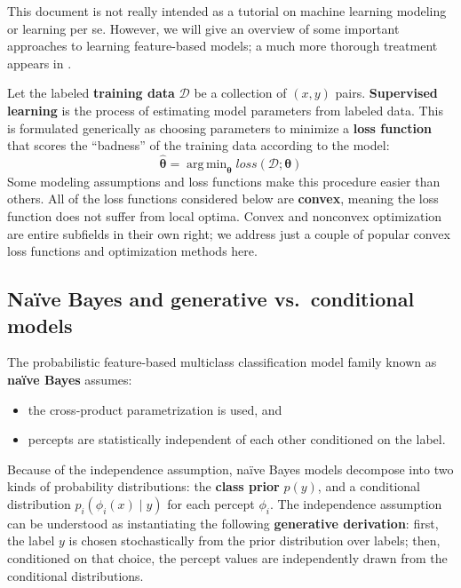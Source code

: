 \documentclass[11pt,letterpaper]{article}
\DeclareMathOperator*{\argmin}{arg\,min}
\begin{document}
This document is not really intended as a tutorial on machine learning modeling or learning per se. 
However, we will give an overview of some important approaches to learning feature-based models; 
a much more thorough treatment appears in \citet{smith}. 

Let the labeled \textbf{training data} $\mathcal{D}$ be a collection of $(x,y)$ pairs.
\textbf{Supervised learning} is the process of estimating model parameters from labeled data.
This is formulated generically as choosing parameters to minimize a \textbf{loss function} that scores the 
``badness'' of the training data according to the model:
\begin{equation}
\hat{\boldsymbol{\theta}} = \argmin_{\boldsymbol{\theta}} \textit{loss}(\mathcal{D}; \boldsymbol{\theta})
\end{equation}
Some modeling assumptions and loss functions make this procedure easier than others.
All of the loss functions considered below are \textbf{convex}, 
meaning the loss function does not suffer from local optima.
Convex and nonconvex optimization are entire subfields in their own right; 
we address just a couple of popular convex loss functions and optimization methods here.

\subsection{Na\"{i}ve Bayes and generative vs.~conditional models}\label{sec:naive}

The probabilistic feature-based multiclass classification model family known as \textbf{na\"{i}ve Bayes} assumes:
\begin{itemize}
  \item the cross-product parametrization is used, and
  \item percepts are statistically independent of each other conditioned on the label.
\end{itemize}

Because of the independence assumption, na\"{i}ve Bayes models decompose into two kinds of probability distributions:
the \textbf{class prior} $p(y)$, and a conditional distribution $p_i(\phi_i(x) \mid y)$ for each percept $\phi_i$.
The independence assumption can be understood as instantiating the following \textbf{generative derivation}:
first, the label $y$ is chosen stochastically from the prior distribution over labels; 
then, conditioned on that choice, the percept values are independently drawn from the conditional distributions.
\end{document}
